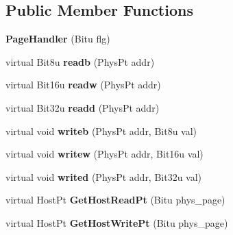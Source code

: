 \subsection*{Public Member Functions}
\begin{DoxyCompactItemize}
\item 
\hypertarget{classPageHandler_a009efc4a2c49e562c8a0e0dca2bb91eb}{{\bfseries Page\-Handler} (Bitu flg)}\label{classPageHandler_a009efc4a2c49e562c8a0e0dca2bb91eb}

\item 
\hypertarget{classPageHandler_ab67e01e9711d12254bf24b4e47053499}{virtual Bit8u {\bfseries readb} (Phys\-Pt addr)}\label{classPageHandler_ab67e01e9711d12254bf24b4e47053499}

\item 
\hypertarget{classPageHandler_adc962fd27081db0c3886a37167caf810}{virtual Bit16u {\bfseries readw} (Phys\-Pt addr)}\label{classPageHandler_adc962fd27081db0c3886a37167caf810}

\item 
\hypertarget{classPageHandler_a4b164a373fe7cba864af8b4b9646d37e}{virtual Bit32u {\bfseries readd} (Phys\-Pt addr)}\label{classPageHandler_a4b164a373fe7cba864af8b4b9646d37e}

\item 
\hypertarget{classPageHandler_aac73aaf9ff45cff169418ae0be843799}{virtual void {\bfseries writeb} (Phys\-Pt addr, Bit8u val)}\label{classPageHandler_aac73aaf9ff45cff169418ae0be843799}

\item 
\hypertarget{classPageHandler_a0a1be901ae9eb7f9dfd30da925f3091e}{virtual void {\bfseries writew} (Phys\-Pt addr, Bit16u val)}\label{classPageHandler_a0a1be901ae9eb7f9dfd30da925f3091e}

\item 
\hypertarget{classPageHandler_a07ea38766292b3a0492b9c28c0f0f276}{virtual void {\bfseries writed} (Phys\-Pt addr, Bit32u val)}\label{classPageHandler_a07ea38766292b3a0492b9c28c0f0f276}

\item 
\hypertarget{classPageHandler_aec146fc4be69c0f37707c97aa1d9d7a2}{virtual Host\-Pt {\bfseries Get\-Host\-Read\-Pt} (Bitu phys\-\_\-page)}\label{classPageHandler_aec146fc4be69c0f37707c97aa1d9d7a2}

\item 
\hypertarget{classPageHandler_a9be437d29e87536d012d4520cb3ec52d}{virtual Host\-Pt {\bfseries Get\-Host\-Write\-Pt} (Bitu phys\-\_\-page)}\label{classPageHandler_a9be437d29e87536d012d4520cb3ec52d}


\end{DoxyCompactItemize}

